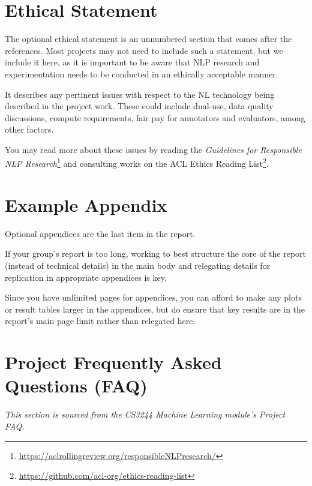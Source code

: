 \documentclass[11pt]{article}
\begin{document}
\section*{Ethical Statement}

The optional ethical statement is an unnumbered section that comes after the references.  Most projects may not need to include such a statement, but we include it here, as it is important to be aware that NLP research and experimentation needs to be conducted in an ethically acceptable manner.  

It describes any pertinent issues with respect to the NL technology being described in the project work.  These could include dual-use, data quality discussions, compute requirements, fair pay for annotators and evaluators, among other factors.  

You may read more about these issues by reading the {\it Guidelines for Responsible NLP Research}\footnote{\url{https://aclrollingreview.org/responsibleNLPresearch/}} 
and consulting works on the ACL Ethics Reading List\footnote{\url{https://github.com/acl-org/ethics-reading-list}}.

\appendix

\section{Example Appendix}
\label{sec:appendix}

Optional appendices are the last item in the report.

If your group's report is too long, working to best structure the core of the report (instead of technical details) in the main body and relegating details for replication in appropriate appendices is key.  

Since you have unlimited pages for appendices, you can afford to make any plots or result tables larger in the appendices, but do ensure that key results are in the report's main page limit rather than relegated here.

\section{Project Frequently Asked Questions (FAQ)}

{\it This section is sourced from the CS3244 Machine Learning module's Project FAQ.}

\small
\end{document}
